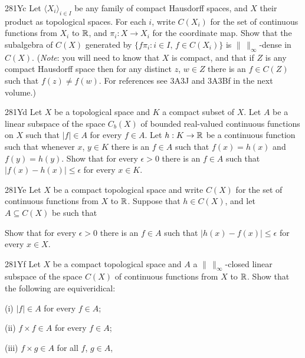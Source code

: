 {\spheader 281Yc Let $\langle X_i\rangle_{i\in I}$ be any family 
of compact Hausdorff spaces, and $X$ their product as topological 
spaces.   For each $i$, write $C(X_i)$ for the set of continuous 
functions from $X_i$ to $\Bbb R$, and $\pi_i:X\to X_i$ for the 
coordinate map.   Show that the subalgebra of $C(X)$ generated by  
$\{f\pi_i:i\in I,\,f\in C(X_i)\}$ is 
$\|\,\|_{\infty}$-dense in $C(X)$.   ({\it Note\/}:  you will need to 
know that $X$ is compact, and that if $Z$ is any compact Hausdorff space 
then for any distinct $z$, $w\in Z$ there is an $f\in C(Z)$ such that 
$f(z)\ne f(w)$.   For references see 3A3J and 3A3Bf in the next volume.) 
      
\spheader 281Yd Let $X$ be a topological space and $K$ a compact 
subset of $X$.   Let $A$ be a linear subspace of the space $C_b(X)$ of 
bounded
real-valued continuous functions on $X$ such that $|f|\in A$ for every 
$f\in A$.   Let $h:K\to\Bbb R$ be a continuous function such that 
whenever $x$, $y\in K$ there is an $f\in A$ such that $f(x)=h(x)$ and 
$f(y)=h(y)$.   Show that for every $\epsilon>0$ there is an $f\in A$ 
such that $|f(x)-h(x)|\le\epsilon$ for every $x\in K$. 
      
\spheader 281Ye Let $X$ be a compact topological space and write 
$C(X)$ for the set of continuous functions from $X$ to $\Bbb R$. Suppose 
that $h\in C(X)$, and let $A\subseteq C(X)$ be such that 
      
      
      
      
\noindent Show that for every $\epsilon>0$ there is an $f\in A$ such 
that $|h(x)-f(x)|\le\epsilon$ for every $x\in X$. 
      
\spheader 281Yf Let $X$ be a compact topological space and $A$ a 
$\|\,\|_{\infty}$-closed linear subspace of the space $C(X)$ of 
continuous functions from $X$ to $\Bbb R$.   Show that the following are 
equiveridical: 
      
\quad (i) $|f|\in A$ for every $f\in A$; 
      
\quad (ii) $f\times f\in A$ for every $f\in A$; 
      
\quad (iii) $f\times g\in A$ for all $f$, $g\in A$, 
      
}
